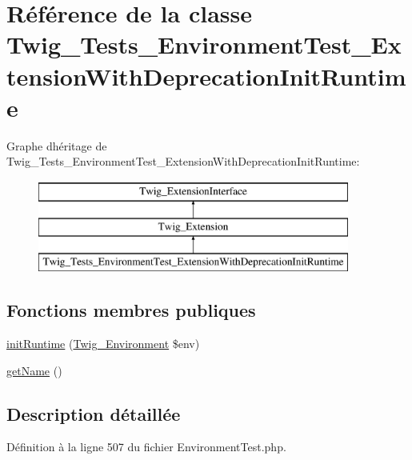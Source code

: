 \hypertarget{class_twig___tests___environment_test___extension_with_deprecation_init_runtime}{}\section{Référence de la classe Twig\+\_\+\+Tests\+\_\+\+Environment\+Test\+\_\+\+Extension\+With\+Deprecation\+Init\+Runtime}
\label{class_twig___tests___environment_test___extension_with_deprecation_init_runtime}
Graphe d\textquotesingle{}héritage de Twig\+\_\+\+Tests\+\_\+\+Environment\+Test\+\_\+\+Extension\+With\+Deprecation\+Init\+Runtime\+:\begin{figure}[H]
\begin{center}
\leavevmode
\includegraphics[height=3.000000cm]{class_twig___tests___environment_test___extension_with_deprecation_init_runtime}
\end{center}
\end{figure}
\subsection*{Fonctions membres publiques}
\begin{DoxyCompactItemize}
\item 
\hyperlink{class_twig___tests___environment_test___extension_with_deprecation_init_runtime_a58a853f61d095249f28927c0e40441ff}{init\+Runtime} (\hyperlink{class_twig___environment}{Twig\+\_\+\+Environment} \$env)
\item 
\hyperlink{class_twig___tests___environment_test___extension_with_deprecation_init_runtime_a3d0963e68bb313b163a73f2803c64600}{get\+Name} ()
\end{DoxyCompactItemize}


\subsection{Description détaillée}


Définition à la ligne 507 du fichier Environment\+Test.\+php.



